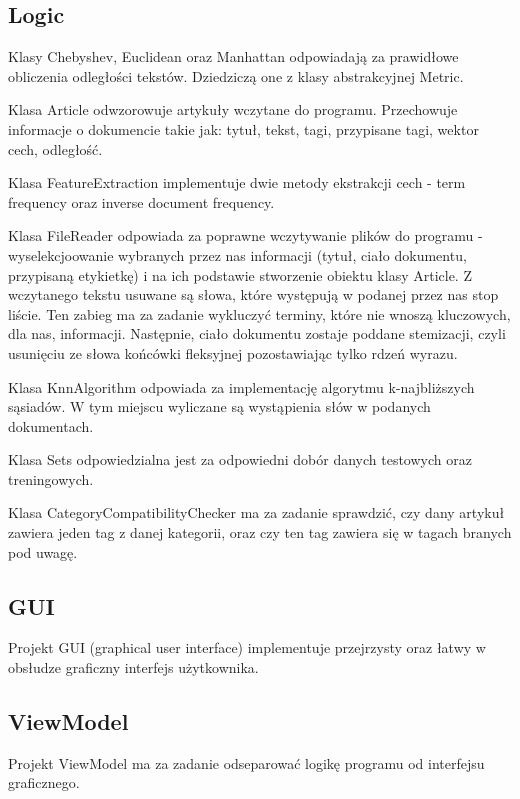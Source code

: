 \documentclass{classrep}
\begin{document}
\subsection{Logic}
Klasy Chebyshev, Euclidean oraz Manhattan odpowiadają za prawidłowe obliczenia odległości tekstów. Dziedziczą one z klasy abstrakcyjnej Metric. \newline

Klasa Article odwzorowuje artykuły wczytane do programu. Przechowuje informacje o dokumencie takie jak: tytuł, tekst, tagi, przypisane tagi, wektor cech, odległość. \newline

Klasa FeatureExtraction implementuje dwie metody ekstrakcji cech - term frequency oraz inverse document frequency. \newline

Klasa FileReader odpowiada za poprawne wczytywanie plików do programu - wyselekcjoowanie wybranych przez nas informacji (tytuł, ciało dokumentu, przypisaną etykietkę) i na ich podstawie stworzenie obiektu klasy Article. Z wczytanego tekstu usuwane są słowa, które występują w podanej przez nas stop liście. Ten zabieg ma za zadanie wykluczyć terminy, które nie wnoszą kluczowych, dla nas, informacji. Następnie, ciało dokumentu zostaje poddane stemizacji, czyli usunięciu ze słowa końcówki fleksyjnej pozostawiając tylko rdzeń wyrazu. \newline

Klasa KnnAlgorithm odpowiada za implementację algorytmu k-najbliższych sąsiadów. W tym miejscu wyliczane są wystąpienia słów w podanych dokumentach. \newline

Klasa Sets odpowiedzialna jest za odpowiedni dobór danych testowych oraz treningowych. \newline

Klasa CategoryCompatibilityChecker ma za zadanie sprawdzić, czy dany artykuł zawiera jeden tag z danej kategorii, oraz czy ten tag zawiera się w tagach branych pod uwagę.

\subsection{GUI}
Projekt GUI (graphical user interface) implementuje przejrzysty oraz łatwy w obsłudze graficzny interfejs użytkownika. 

\subsection{ViewModel}
Projekt ViewModel ma za zadanie odseparować logikę programu od interfejsu graficznego. \newline
\end{document}

